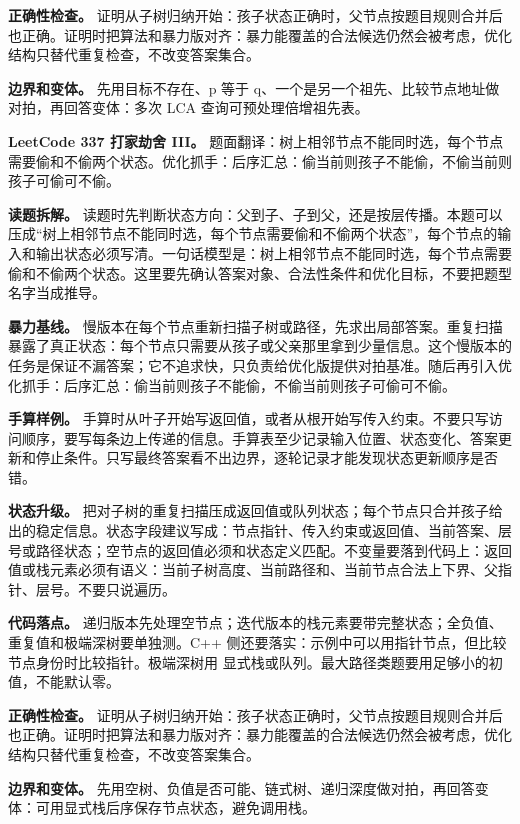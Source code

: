\textbf{正确性检查。} 证明从子树归纳开始：孩子状态正确时，父节点按题目规则合并后也正确。证明时把算法和暴力版对齐：暴力能覆盖的合法候选仍然会被考虑，优化结构只替代重复检查，不改变答案集合。

\textbf{边界和变体。} 先用目标不存在、p 等于 q、一个是另一个祖先、比较节点地址做对拍，再回答变体：多次 LCA 查询可预处理倍增祖先表。

\noindent\textbf{LeetCode 337 打家劫舍 III。} 题面翻译：树上相邻节点不能同时选，每个节点需要偷和不偷两个状态。优化抓手：后序汇总：偷当前则孩子不能偷，不偷当前则孩子可偷可不偷。

\textbf{读题拆解。} 读题时先判断状态方向：父到子、子到父，还是按层传播。本题可以压成“树上相邻节点不能同时选，每个节点需要偷和不偷两个状态”，每个节点的输入和输出状态必须写清。一句话模型是：树上相邻节点不能同时选，每个节点需要偷和不偷两个状态。这里要先确认答案对象、合法性条件和优化目标，不要把题型名字当成推导。

\textbf{暴力基线。} 慢版本在每个节点重新扫描子树或路径，先求出局部答案。重复扫描暴露了真正状态：每个节点只需要从孩子或父亲那里拿到少量信息。这个慢版本的任务是保证不漏答案；它不追求快，只负责给优化版提供对拍基准。随后再引入优化抓手：后序汇总：偷当前则孩子不能偷，不偷当前则孩子可偷可不偷。

\textbf{手算样例。} 手算时从叶子开始写返回值，或者从根开始写传入约束。不要只写访问顺序，要写每条边上传递的信息。手算表至少记录输入位置、状态变化、答案更新和停止条件。只写最终答案看不出边界，逐轮记录才能发现状态更新顺序是否错。

\textbf{状态升级。} 把对子树的重复扫描压成返回值或队列状态；每个节点只合并孩子给出的稳定信息。状态字段建议写成：节点指针、传入约束或返回值、当前答案、层号或路径状态；空节点的返回值必须和状态定义匹配。不变量要落到代码上：返回值或栈元素必须有语义：当前子树高度、当前路径和、当前节点合法上下界、父指针、层号。不要只说遍历。

\textbf{代码落点。} 递归版本先处理空节点；迭代版本的栈元素要带完整状态；全负值、重复值和极端深树要单独测。C++ 侧还要落实：示例中可以用指针节点，但比较节点身份时比较指针。极端深树用  显式栈或队列。最大路径类题要用足够小的初值，不能默认零。

\textbf{正确性检查。} 证明从子树归纳开始：孩子状态正确时，父节点按题目规则合并后也正确。证明时把算法和暴力版对齐：暴力能覆盖的合法候选仍然会被考虑，优化结构只替代重复检查，不改变答案集合。

\textbf{边界和变体。} 先用空树、负值是否可能、链式树、递归深度做对拍，再回答变体：可用显式栈后序保存节点状态，避免调用栈。

